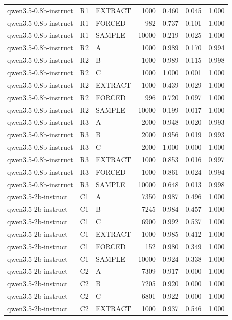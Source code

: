 \begin{table}
\begin{tabular}{lllrrrr}
qwen3.5-0.8b-instruct & R1 & EXTRACT & 1000 & 0.460 & 0.045 & 1.000 \\
qwen3.5-0.8b-instruct & R1 & FORCED & 982 & 0.737 & 0.101 & 1.000 \\
qwen3.5-0.8b-instruct & R1 & SAMPLE & 10000 & 0.219 & 0.025 & 1.000 \\
qwen3.5-0.8b-instruct & R2 & A & 1000 & 0.989 & 0.170 & 0.994 \\
qwen3.5-0.8b-instruct & R2 & B & 1000 & 0.989 & 0.115 & 0.998 \\
qwen3.5-0.8b-instruct & R2 & C & 1000 & 1.000 & 0.001 & 1.000 \\
qwen3.5-0.8b-instruct & R2 & EXTRACT & 1000 & 0.439 & 0.029 & 1.000 \\
qwen3.5-0.8b-instruct & R2 & FORCED & 996 & 0.720 & 0.097 & 1.000 \\
qwen3.5-0.8b-instruct & R2 & SAMPLE & 10000 & 0.199 & 0.017 & 1.000 \\
qwen3.5-0.8b-instruct & R3 & A & 2000 & 0.948 & 0.020 & 0.993 \\
qwen3.5-0.8b-instruct & R3 & B & 2000 & 0.956 & 0.019 & 0.993 \\
qwen3.5-0.8b-instruct & R3 & C & 2000 & 1.000 & 0.000 & 1.000 \\
qwen3.5-0.8b-instruct & R3 & EXTRACT & 1000 & 0.853 & 0.016 & 0.997 \\
qwen3.5-0.8b-instruct & R3 & FORCED & 1000 & 0.861 & 0.024 & 0.994 \\
qwen3.5-0.8b-instruct & R3 & SAMPLE & 10000 & 0.648 & 0.013 & 0.998 \\
qwen3.5-2b-instruct & C1 & A & 7350 & 0.987 & 0.496 & 1.000 \\
qwen3.5-2b-instruct & C1 & B & 7245 & 0.984 & 0.457 & 1.000 \\
qwen3.5-2b-instruct & C1 & C & 6900 & 0.992 & 0.537 & 1.000 \\
qwen3.5-2b-instruct & C1 & EXTRACT & 1000 & 0.985 & 0.412 & 1.000 \\
qwen3.5-2b-instruct & C1 & FORCED & 152 & 0.980 & 0.349 & 1.000 \\
qwen3.5-2b-instruct & C1 & SAMPLE & 10000 & 0.924 & 0.338 & 1.000 \\
qwen3.5-2b-instruct & C2 & A & 7309 & 0.917 & 0.000 & 1.000 \\
qwen3.5-2b-instruct & C2 & B & 7205 & 0.920 & 0.000 & 1.000 \\
qwen3.5-2b-instruct & C2 & C & 6801 & 0.922 & 0.000 & 1.000 \\
qwen3.5-2b-instruct & C2 & EXTRACT & 1000 & 0.937 & 0.546 & 1.000 \\

\end{tabular}
\end{table}
